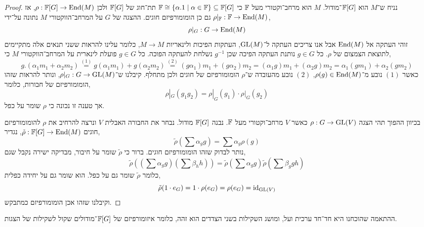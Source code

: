 \begin{proof}
	נניח ש־$M$ הוא $\mathbb{F}[G]$־מודול.
	$M$ הוא מרחב־וקטורי מעל $\mathbb{F}$ כי $\mathbb{F} \cong \{ \alpha . 1 \mid \alpha \in \mathbb{F} \} \subseteq \mathbb{F}[G]$ תת־חוג של $\mathbb{F}[G]$ ולכן $\rho : \mathbb{F}[G] \to \operatorname{End}(M)$,
	אז $\rho |_{\mathbb{F}} : \mathbb{F} \to \operatorname{End}(M)$ גם כן הומומורפיזם חוגים.
	ההצגה של $G$ על המרחב־הווקטורי $M$ נתונה על־ידי,
	\[
		\rho|_G : G \to \operatorname{End}(M)
	\]
	זוהי העתקה אל $\operatorname{End}(M)$ אבל אנו צריכים העתקה ל־$\operatorname{GL}(M)$, העתקות הפיכות ולינאריות $M \to M$, כלומר עלינו להראות ששני תנאים אלה מתקיימים לתוצאת הצמצום של $\rho$.
	כל $g \in G$ נותנת העתקה הפיכה שכן $g^{-1}$ נשלחת להעתקה הפוכה.
	כל $g \in G$ פועלת לינארית על המרחב־הווקטורי $M$ כי,
	\[
		g . (\alpha_1 m_1 + \alpha_2 m_2)
		\overset{(1)}{=} g(\alpha_1 m_1) + g(\alpha_2 m_2)
		\overset{(2)}{=} (g \alpha_1) m_1 + (g \alpha_2) m_2
		= (\alpha_1 g) m_1 + (\alpha_2 g) m_2
		= \alpha_1 (g m_1) + \alpha_2 (g m_2)
	\]
	כאשר $(1)$ נובע מ־$\rho(g) \in \operatorname{End}(M)$, $(2)$ נובע מהעובדה ש־$\rho$ הומומורפיזם של חוגים ולכן מתחלף.
	קיבלנו ש־$\rho |_G : G \to \operatorname{GL}(M)$, ונותר להראות שזהו הומומורפיזם של חבורות, כלומר,
	\[
		\rho|_G(g_1 g_2)
		= \rho|_G(g_1) \cdot \rho|_G(g_2)
	\]
	אך טענה זו נכונה כי $\rho$ שומר על כפל.

	בכיוון ההפוך תהי הצגה $\rho : G \to \operatorname{GL}(V)$ כאשר $V$ מרחב־וקטורי מעל $\mathbb{F}$.
	נבנה $\mathbb{F}[G]$ מודול. נבחר את החבורה האבלית $V$ ונרצה להרחיב את $\rho$ להומומורפיזם חוגים $\tilde{\rho} : \mathbb{F}[G] \to \operatorname{End}(M)$, נגדיר,
	\[
		\tilde{\rho}\left(\sum \alpha_g g\right)
		= \sum \alpha_g \rho(g)
	\]
	נותר לבדוק שזהו הומומורפיזם חוגים.
	ברור כי $\tilde{\rho}$ שומר על חיבור, מבדיקה ישירה נקבל שגם,
	\[
		\tilde{\rho}\left(\left(\sum \alpha_g g\right)\left(\sum \beta_h h\right)\right)
		= \tilde{\rho}\left(\sum \alpha_g g\right) \tilde{\rho}\left(\sum \beta_g g h\right)
	\]
	כלומר $\tilde{\rho}$ שומר גם על כפל.
	הוא שומר גם על יחידה כפלית,
	\[
		\tilde{\rho}(1 \cdot e_G)
		= 1 \cdot \rho(e_G)
		= \rho(e_G)
		= \operatorname{id}_{\operatorname{GL}(V)}
	\]
	וקיבלנו שזהו אכן הומומורפיזם כמתבקש.
\end{proof}
\begin{remark}
	ההתאמה שהוכחנו היא חד־חד ערכית ועל, ומושג השקילות בשני הצדדים הוא זהה, כלומר איזומורפיזם של $\mathbb{F}[G]$־מודולים שקול לשקילות של הצגות.
\end{remark}

